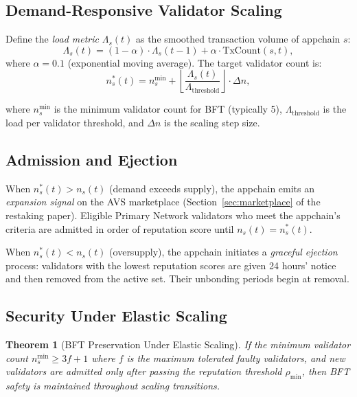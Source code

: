 \documentclass[11pt]{article}
\newtheorem{theorem}{Theorem}
\begin{document}
\subsection{Demand-Responsive Validator Scaling}

Define the \emph{load metric} $\Lambda_s(t)$ as the smoothed transaction volume of
appchain $s$:
\[
  \Lambda_s(t) = (1-\alpha) \cdot \Lambda_s(t-1) + \alpha \cdot \text{TxCount}(s, t),
\]
where $\alpha = 0.1$ (exponential moving average). The target validator count is:
\begin{equation}
  n_s^*(t) = n_s^{\min} + \left\lfloor \frac{\Lambda_s(t)}{\Lambda_{\text{threshold}}} \right\rfloor \cdot \Delta n,
  \label{eq:elastic}
\end{equation}

where $n_s^{\min}$ is the minimum validator count for BFT (typically 5), $\Lambda_{\text{threshold}}$
is the load per validator threshold, and $\Delta n$ is the scaling step size.

\subsection{Admission and Ejection}

When $n_s^*(t) > n_s(t)$ (demand exceeds supply), the appchain emits an \emph{expansion
signal} on the AVS marketplace (Section~\ref{sec:marketplace} of the restaking paper).
Eligible Primary Network validators who meet the appchain's criteria are admitted in order
of reputation score until $n_s(t) = n_s^*(t)$.

When $n_s^*(t) < n_s(t)$ (oversupply), the appchain initiates a \emph{graceful ejection}
process: validators with the lowest reputation scores are given 24 hours' notice and
then removed from the active set. Their unbonding periods begin at removal.

\subsection{Security Under Elastic Scaling}

\begin{theorem}[BFT Preservation Under Elastic Scaling]
If the minimum validator count $n_s^{\min} \geq 3f+1$ where $f$ is the maximum tolerated
faulty validators, and new validators are admitted only after passing the reputation
threshold $\rho_{\min}$, then BFT safety is maintained throughout scaling transitions.
\end{theorem}
\end{document}
